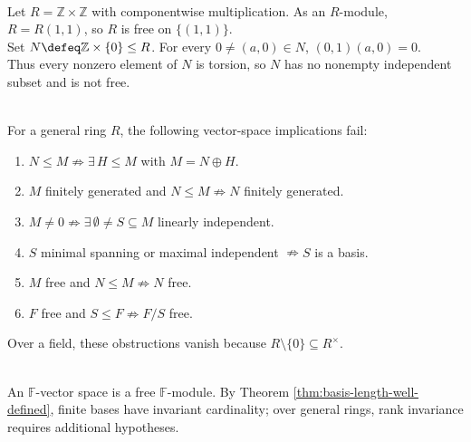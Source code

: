 \begin{example} \label{ex:free-module-with-nonfree-submodule} \\
Let $R=\mathbb{Z}\times\mathbb{Z}$ with componentwise multiplication. As an $R$-module, $R=R(1,1)$, so $R$ is free on $\{(1,1)\}$.\\
Set $N\defeq\mathbb{Z}\times\{0\}\leq R$. For every $0\neq(a,0)\in N$, $(0,1)(a,0)=0$.\\
Thus every nonzero element of $N$ is torsion, so $N$ has no nonempty independent subset and is not free.
\end{example}

\begin{principle} \label{princ:modules-not-vector-spaces} \\
For a general ring $R$, the following vector-space implications fail:
\begin{enumerate}[label=(\roman*)]
\setlength{\itemsep}{0pt}
\item $N\leq M\nRightarrow\exists\,H\leq M$ with $M=N\oplus H$.
\item $M$ finitely generated and $N\leq M\nRightarrow N$ finitely generated.
\item $M\neq0\nRightarrow\exists\,\emptyset\neq S\subseteq M$ linearly independent.
\item $S$ minimal spanning or maximal independent $\nRightarrow S$ is a basis.
\item $M$ free and $N\leq M\nRightarrow N$ free.
\item $F$ free and $S\leq F\nRightarrow F/S$ free.
\end{enumerate}
Over a field, these obstructions vanish because $R\setminus\{0\}\subseteq R^\times$.
\end{principle}

\begin{perspective} \label{per:dimension-as-field-case-of-rank} \\
An $\mathbb{F}$-vector space is a free $\mathbb{F}$-module. By Theorem \ref{thm:basis-length-well-defined}, finite bases have invariant cardinality; over general rings, rank invariance requires additional hypotheses.
\end{perspective}


